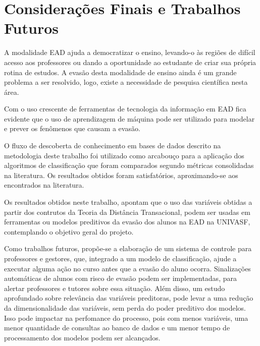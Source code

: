 \chapter{Considerações Finais e Trabalhos Futuros}

A modalidade EAD ajuda a democratizar o ensino, levando-o às regiões de difícil
acesso aos professores ou dando a oportunidade ao estudante de criar sua própria
rotina de estudos. A evasão desta modalidade de ensino ainda é um grande
problema a ser resolvido, logo, existe a necessidade de pesquisa científica
nesta área.

Com o uso crescente de ferramentas de tecnologia da informação em EAD fica
evidente que o uso de aprendizagem de máquina pode ser utilizado para modelar e
prever os fenômenos que causam a evasão.

O fluxo de descoberta de conhecimento em bases de dados descrito na metodologia
deste trabalho foi utilizado como arcabouço para a aplicação dos algoritmos de
classificação que foram comparados segundo métricas consolidadas na literatura.
Os resultados obtidos foram satisfatórios, aproximando-se aos encontrados na
literatura.

Os resultados obtidos neste trabalho, apontam que o uso das variáveis obtidas
a partir dos contrutos da Teoria da Distância Transacional, podem ser usadas
em ferramentas ou modelos preditivos da evasão dos alunos na EAD na UNIVASF,
contemplando o objetivo geral do projeto.

Como trabalhos futuros, propõe-se a elaboração de um sistema de controle para
professores e gestores, que, integrado a um modelo de classificação, ajude a
executar alguma ação no curso antes que a evasão do aluno ocorra. Sinalizações
automáticas de alunos com risco de evasão podem ser implementadas, para alertar
professores e tutores sobre essa situação. Além disso, um estudo aprofundado
sobre relevância das variáveis preditoras, pode levar a uma redução da
dimensionalidade das variáveis, sem perda do poder preditivo dos modelos. Isso
pode impactar na perfomance do processo, pois com menos variáveis, uma menor
quantidade de consultas ao banco de dados e um menor tempo de processamento dos
modelos podem ser alcançados.
